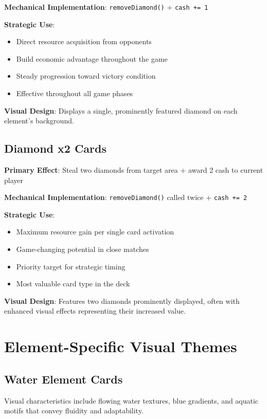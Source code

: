 \documentclass[12pt,a4paper]{article}
\begin{document}
\textbf{Mechanical Implementation}: \texttt{removeDiamond()} + \texttt{cash += 1}

\textbf{Strategic Use}:
\begin{itemize}
    \item Direct resource acquisition from opponents
    \item Build economic advantage throughout the game
    \item Steady progression toward victory condition
    \item Effective throughout all game phases
\end{itemize}

\textbf{Visual Design}: Displays a single, prominently featured diamond on each element's background.

\subsection{Diamond x2 Cards}
\textbf{Primary Effect}: Steal two diamonds from target area + award 2 cash to current player

\textbf{Mechanical Implementation}: \texttt{removeDiamond()} called twice + \texttt{cash += 2}

\textbf{Strategic Use}:
\begin{itemize}
    \item Maximum resource gain per single card activation
    \item Game-changing potential in close matches
    \item Priority target for strategic timing
    \item Most valuable card type in the deck
\end{itemize}

\textbf{Visual Design}: Features two diamonds prominently displayed, often with enhanced visual effects representing their increased value.

\section{Element-Specific Visual Themes}

\subsection{\textcolor{waterblue}{Water Element Cards}}
Visual characteristics include flowing water textures, blue gradients, and aquatic motifs that convey fluidity and adaptability.
\end{document}
